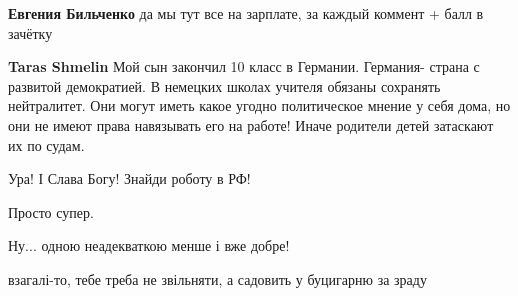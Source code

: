 \begin{itemize}
\begin{itemize}
 
\textbf{Евгения Бильченко} да мы тут все на зарплате, за каждый коммент + балл в зачётку

 
\textbf{Taras Shmelin} Мой сын закончил 10 класс в Германии. Германия- страна с развитой демократией. В немецких школах учителя обязаны сохранять нейтралитет. Они могут иметь какое угодно политическое мнение у себя дома, но они не имеют права навязывать его на работе! Иначе родители детей затаскают их по судам.

\end{itemize}

 
Ура! І Слава Богу! Знайди роботу в РФ!

 
Просто супер.

 
Ну... одною неадекваткою менше і вже добре!

 
взагалі-то, тебе треба не звільняти, а садовить у буцигарню за зраду

 


\end{itemize}
